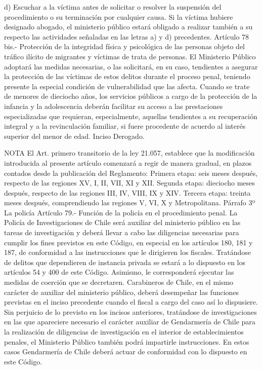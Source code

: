     d) Escuchar a la víctima antes de solicitar o resolver la suspensión del procedimiento o su terminación por cualquier causa.
    Si la víctima hubiere designado abogado, el ministerio público estará obligado a realizar también a su respecto las actividades señaladas en las letras a) y d) precedentes.
    Artículo 78 bis.- Protección de la integridad física y psicológica de las personas objeto del tráfico ilícito de migrantes y víctimas de trata de personas. El Ministerio Público adoptará las medidas necesarias, o las solicitará, en su caso, tendientes a asegurar la protección de las víctimas de estos delitos durante el proceso penal, teniendo presente la especial condición de vulnerabilidad que las afecta.
    Cuando se trate de menores de dieciocho años, los servicios públicos a cargo de la protección de la infancia y la adolescencia deberán facilitar su acceso a las prestaciones especializadas que requieran, especialmente, aquellas tendientes a su recuperación integral y a la revinculación familiar, si fuere procedente de acuerdo al interés superior del menor de edad.
    Inciso Derogado.





NOTA
    El Art. primero transitorio de la ley 21.057, establece que la modificación introducida al presente artículo comenzará a regir de manera gradual, en plazos contados desde la publicación del Reglamento: Primera etapa: seis meses después, respecto de las regiones XV, I, II, VII, XI y XII. Segunda etapa: dieciocho meses después, respecto de las regiones III, IV, VIII, IX y XIV. Tercera etapa:  treinta meses después, comprendiendo las regiones V, VI, X y Metropolitana.
    Párrafo 3º La policía
    Artículo 79.- Función de la policía en el procedimiento penal. La Policía de Investigaciones de Chile será auxiliar del ministerio público en las tareas de investigación y deberá llevar a cabo las diligencias necesarias para cumplir los fines previstos en este Código, en especial en los artículos 180, 181 y 187, de conformidad a las instrucciones que le dirigieren los fiscales. Tratándose de delitos que dependieren de instancia privada se estará a lo dispuesto en los artículos 54 y 400 de este Código. Asimismo, le corresponderá ejecutar las medidas de coerción que se decretaren.
    Carabineros de Chile, en el mismo carácter de auxiliar del ministerio público, deberá desempeñar las funciones previstas en el inciso precedente cuando el fiscal a cargo del caso así lo dispusiere.
    Sin perjuicio de lo previsto en los incisos anteriores, tratándose de investigaciones en las que apareciere necesario el carácter auxiliar de Gendarmería de Chile para la realización de diligencias de investigación en el interior de establecimientos penales, el Ministerio Público también podrá impartirle instrucciones. En estos casos Gendarmería de Chile deberá actuar de conformidad con lo dispuesto en este Código.

